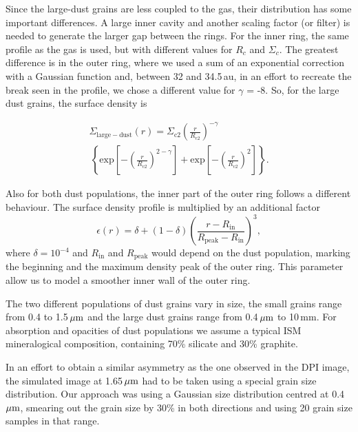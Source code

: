 \documentclass[letters, usenatbib]{mnras}
\begin{document}
Since the large-dust grains are less coupled to the gas, their distribution has some important differences. A large inner cavity and another scaling factor (or filter) is needed to generate the larger gap between the rings. For the inner ring, the same profile as the gas is used, but with different values for $R_c$ and $\Sigma_c$. The greatest difference is in the outer ring, where we used a sum of an exponential correction with a Gaussian function and, between 32 and 34.5\,au, in an effort to recreate the break seen in the profile, we chose a different value for $\gamma$ = -8. So, for the large dust grains, the surface density is 

\begin{multline}
  \Sigma_{\mathrm{large-dust}}(r) = \Sigma_{\mathrm{c}2} \left(\frac{r}{R_{\mathrm{c}2}}\right)^{-\gamma}  \\ \, \left\{ \mathrm{exp}\left[-\left(\frac{r}{R_{\mathrm{c}2}}\right)^{2-\gamma}\right] +  \mathrm{exp}\left[-\left(\frac{r}{R_{\mathrm{c}2}}\right)^{2}\right]\right\}.
\end{multline}

Also for both dust populations, the inner part of the outer ring follows a different behaviour. The surface density profile is multiplied by an additional factor
\begin{equation}
    \epsilon(r) = \delta +  (1 - \delta) \left(\frac{ r - R_\mathrm{in}}{R_\mathrm{peak} - R_\mathrm{in}}\right)^3,
\end{equation}
where $\delta=10^{-4}$ and $R_\mathrm{in}$ and $R_\mathrm{peak}$ would depend on the dust population, marking the beginning and the maximum density peak of the outer ring. This parameter allow us to model a smoother inner wall of the outer ring.

The two different populations of dust grains vary in size, the small grains range from  0.4 to 1.5\,$\hbox{$\mu$m}$ and the large dust grains range from 0.4\,$\hbox{$\mu$m}$ to 10\,mm. For absorption and opacities of dust populations we assume a typical ISM mineralogical composition, containing 70\% silicate and 30\% graphite.

In an effort to obtain a similar asymmetry as the one observed in the DPI image, the simulated image at 1.65\,$\hbox{$\mu$m}$ had to be taken using a special grain size distribution. Our approach was using a Gaussian size distribution centred at 0.4\,$\hbox{$\mu$m}$, smearing out the grain size by 30\% in both directions and using 20 grain size samples in that range.
\end{document}
